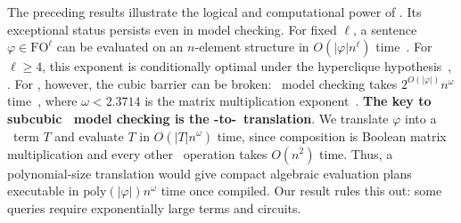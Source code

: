 \smallskip
{}
The preceding results illustrate the logical and computational power of \FOthree.
Its exceptional status persists even in model checking.
For fixed $\ell$, a sentence $\varphi \in \mathrm{FO}^{\ell}$ can be evaluated on an $n$-element structure in $O(|\varphi|n^\ell)$ time~\citep{vardi1995}.
For $\ell\ge4$, this exponent is conditionally optimal under the hyperclique hypothesis~\citep{bringmann-slusallek2021}, \citep[Corollary~32]{nakamura-uezato2027}.
For \FOthree, however, the cubic barrier can be broken: \FOthree\ model checking takes $2^{O(|\varphi|)}n^\omega$ time~\citep[Theorem~10]{nakamura-uezato2027}, where $\omega < 2.3714$ is the matrix multiplication exponent~\citep{alman2025}.
%
\textbf{The key to subcubic \FOthree\ model checking is the \FOthree-to-\CoR\ translation}.
We translate $\varphi$ into a \CoR\ term $T$ and evaluate $T$ in $O(|T|n^\omega)$ time,
since composition is Boolean matrix multiplication and every other \CoR\ operation takes $O(n^2)$ time. Thus, a polynomial-size translation would give compact algebraic evaluation plans executable in $\mathrm{poly}(|\varphi|)n^\omega$ time once compiled.
Our result rules this out: some \FOthree queries require exponentially large \CoR terms and circuits.




%







